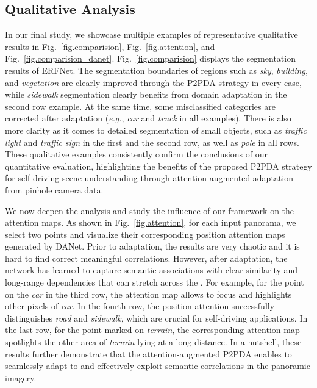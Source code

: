 \documentclass[journal]{IEEEtran}
\begin{document}

\subsection{Qualitative Analysis}
\label{sec:qualitative}

In our final study, we showcase multiple examples of representative qualitative results in Fig.~\ref{fig.comparision}, Fig.~\ref{fig.attention}, and Fig.~\ref{fig.comparision_danet}.
Fig.~\ref{fig.comparision} displays the segmentation results of ERFNet.  
The segmentation boundaries of regions such as \emph{sky}, \emph{building}, and \emph{vegetation} are clearly improved through the P2PDA strategy in every case, while \emph{sidewalk} segmentation clearly benefits from domain adaptation in the second row example.
At the same time, some misclassified categories are corrected after adaptation (\textit{e.g.}, \emph{car} and \emph{truck} in all examples). 
There is also more clarity as it comes to detailed segmentation of small objects, such as \emph{traffic light} and \emph{traffic sign} in the first and the second row, as well as \emph{pole} in all rows. 
These qualitative examples consistently confirm the conclusions of our quantitative evaluation, highlighting the benefits of the proposed P2PDA strategy for  self-driving scene understanding through attention-augmented adaptation from pinhole camera data. 

We now deepen the analysis and study the influence of our framework on the attention maps. As shown in Fig.~\ref{fig.attention}, for each input panorama, we select two points and visualize their corresponding position attention maps generated by DANet.
Prior to adaptation, the results are very chaotic and it is hard to find correct  meaningful correlations.
However, after adaptation, the network has learned to capture semantic associations with clear similarity and long-range dependencies that can stretch across the .
For example, for the point on the \emph{car} in the third row, the attention map allows to focus and highlights other pixels of \emph{car}.
In the fourth row, the position attention successfully distinguishes \emph{road} and \emph{sidewalk}, which are crucial for self-driving applications. 
In the last row, for the point marked on \emph{terrain}, the corresponding attention map spotlights the other area of \emph{terrain} lying at a long distance.
In a nutshell, these  results further demonstrate that the attention-augmented P2PDA enables to seamlessly adapt to and effectively exploit semantic correlations in the panoramic imagery. 
\end{document}
